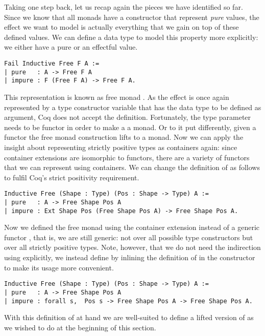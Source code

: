 Taking one step back, let us recap again the pieces we have identified
so far.
Since we know that all monads have a constructor that represent
\emph{pure} values, the effect we want to model is actually
everything that we gain on top of these defined values.
We can define a data type to model this property more explicitly: we
either have a pure or an effectful value.

\begin{verbatim}
Fail Inductive Free F A :=
| pure   : A -> Free F A
| impure : F (Free F A) -> Free F A.
\end{verbatim}

This representation is known as free monad \citep{swierstra2008data}.
As the effect is once again represented by a type constructor
variable  that has the data type to be defined as argument,
Coq does not accept the definition.
Fortunately, the type parameter  needs to be functor in order
to make a  a monad.
Or to it put differently, given a functor  the free monad
construction lifts  to a monad.
Now we can apply the insight about representing strictly positive
types as containers again: since container extensions are isomorphic
to functors, there are a variety of functors that we can represent
using containers.
We can change the definition of  as follows to fulfil Coq's
strict positivity requirement.

\begin{verbatim}
Inductive Free (Shape : Type) (Pos : Shape -> Type) A :=
| pure   : A -> Free Shape Pos A
| impure : Ext Shape Pos (Free Shape Pos A) -> Free Shape Pos A.
\end{verbatim}

Now we defined the free monad using the container extension instead of
a generic functor , that is, we are still generic: not
over all possible type constructors but over all strictly positive
types.
Note, however, that we do not need the indirection using 
explicitly, we instead define  by inlining the definition
of  in the constructor  to make its usage more
convenient.

\begin{verbatim}
Inductive Free (Shape : Type) (Pos : Shape -> Type) A :=
| pure   : A -> Free Shape Pos A
| impure : forall s,  Pos s -> Free Shape Pos A -> Free Shape Pos A.
\end{verbatim}

With this definition of  at hand we are well-suited to
define a lifted version of  as we wished to do at the
beginning of this section.

